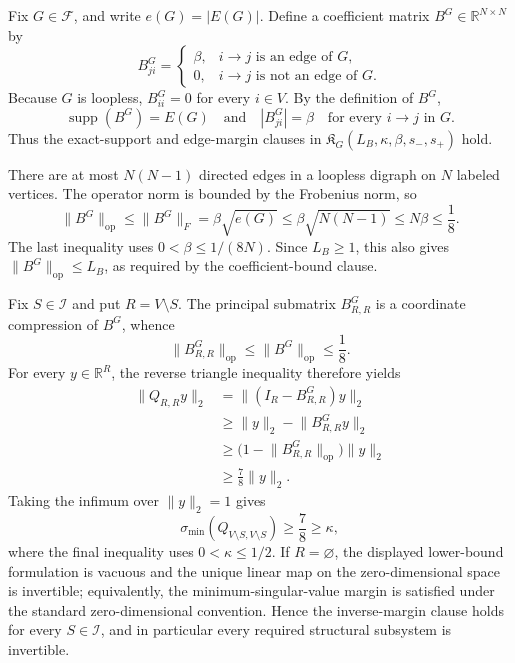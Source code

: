 Fix \(G\in\mathcal F\), and write \(e(G)=|E(G)|\).  Define a coefficient matrix \(B^{G}\in\mathbb R^{N\times N}\) by
\[
 B^{G}_{ji}=\begin{cases}
 \beta,& i\to j\text{ is an edge of }G,\\
 0,& i\to j\text{ is not an edge of }G.
 \end{cases}
\]
Because \(G\) is loopless, \(B^{G}_{ii}=0\) for every \(i\in V\).  By the definition of \(B^{G}\),
\[
 \operatorname{supp}(B^{G})=E(G)
 \quad\text{and}\quad
 |B^{G}_{ji}|=\beta\quad\text{for every }i\to j\text{ in }G.
\]
Thus the exact-support and edge-margin clauses in \(\mathfrak K_G(L_B,\kappa,\beta,s_-,s_+)\) hold.

There are at most \(N(N-1)\) directed edges in a loopless digraph on \(N\) labeled vertices.  The operator norm is bounded by the Frobenius norm, so
\[
 \lVert B^{G}\rVert_{\mathrm{op}}
 \le \lVert B^{G}\rVert_{F}
 =\beta\sqrt{e(G)}
 \le\beta\sqrt{N(N-1)}
 \le N\beta
 \le\frac18.
\]
The last inequality uses \(0<\beta\le 1/(8N)\).  Since \(L_B\ge1\), this also gives \(\lVert B^{G}\rVert_{\mathrm{op}}\le L_B\), as required by the coefficient-bound clause.

Fix \(S\in\mathcal I\) and put \(R=V\setminus S\).  The principal submatrix \(B^{G}_{R,R}\) is a coordinate compression of \(B^{G}\), whence
\[
 \lVert B^{G}_{R,R}\rVert_{\mathrm{op}}
 \le \lVert B^{G}\rVert_{\mathrm{op}}
 \le\frac18.
\]
For every \(y\in\mathbb R^{R}\), the reverse triangle inequality therefore yields
\[
 \begin{aligned}
 \lVert Q_{R,R}y\rVert_2
 &=\lVert (I_R-B^{G}_{R,R})y\rVert_2\\
 &\ge \lVert y\rVert_2-\lVert B^{G}_{R,R}y\rVert_2\\
 &\ge \bigl(1-\lVert B^{G}_{R,R}\rVert_{\mathrm{op}}\bigr)\lVert y\rVert_2\\
 &\ge\frac78\lVert y\rVert_2.
 \end{aligned}
\]
Taking the infimum over \(\lVert y\rVert_2=1\) gives
\[
 \sigma_{\min}(Q_{V\setminus S,V\setminus S})\ge\frac78\ge\kappa,
\]
where the final inequality uses \(0<\kappa\le1/2\).  If \(R=\varnothing\), the displayed lower-bound formulation is vacuous and the unique linear map on the zero-dimensional space is invertible; equivalently, the minimum-singular-value margin is satisfied under the standard zero-dimensional convention.  Hence the inverse-margin clause holds for every \(S\in\mathcal I\), and in particular every required structural subsystem is invertible.


